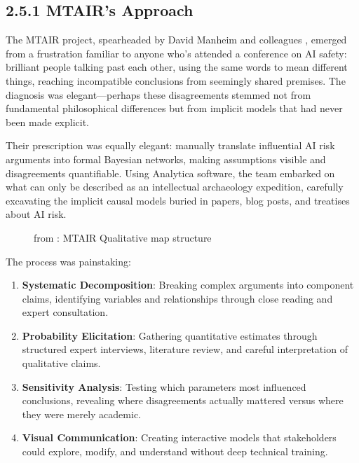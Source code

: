 \documentclass[
  11pt,
  letterpaper,
  openany]{book}
\providecommand{\tightlist}{%
  \setlength{\itemsep}{0pt}\setlength{\parskip}{0pt}}
\begin{document}
\subsection{2.5.1 MTAIR's Approach}\label{sec-mtair-approach}

The MTAIR project, spearheaded by David Manheim and colleagues
\textcite{clarke2022}, emerged from a frustration familiar to anyone
who's attended a conference on AI safety: brilliant people talking past
each other, using the same words to mean different things, reaching
incompatible conclusions from seemingly shared premises. The diagnosis
was elegant---perhaps these disagreements stemmed not from fundamental
philosophical differences but from implicit models that had never been
made explicit.

Their prescription was equally elegant: manually translate influential
AI risk arguments into formal Bayesian networks, making assumptions
visible and disagreements quantifiable. Using Analytica software, the
team embarked on what can only be described as an intellectual
archaeology expedition, carefully excavating the implicit causal models
buried in papers, blog posts, and treatises about AI risk.

\begin{figure}


\caption[MTAIR Qualitative map structure]{\label{fig-mtair-qual-map}from
\textcite{clarke2022}: MTAIR Qualitative map structure}

\end{figure}%

The process was painstaking:

\begin{enumerate}
\def\labelenumi{\arabic{enumi}.}
\tightlist
\item
  \textbf{Systematic Decomposition}: Breaking complex arguments into
  component claims, identifying variables and relationships through
  close reading and expert consultation.
\item
  \textbf{Probability Elicitation}: Gathering quantitative estimates
  through structured expert interviews, literature review, and careful
  interpretation of qualitative claims.
\item
  \textbf{Sensitivity Analysis}: Testing which parameters most
  influenced conclusions, revealing where disagreements actually
  mattered versus where they were merely academic.
\item
  \textbf{Visual Communication}: Creating interactive models that
  stakeholders could explore, modify, and understand without deep
  technical training.
\end{enumerate}
\end{document}
